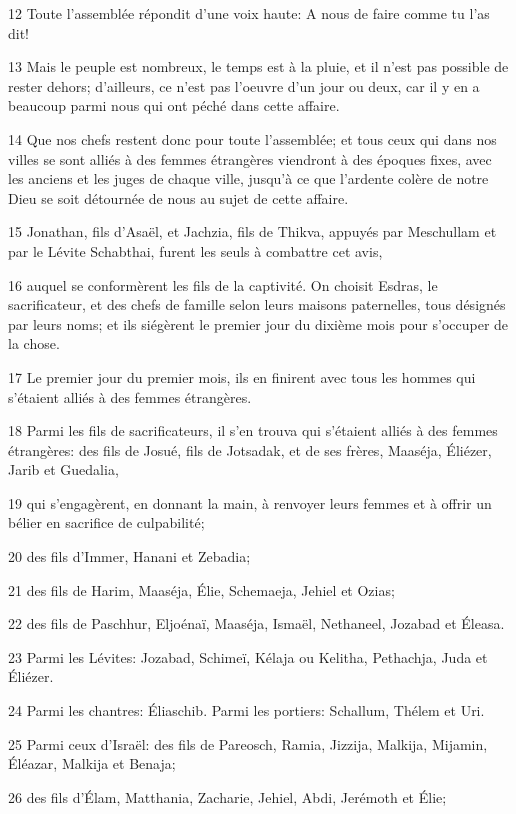 \par 12 Toute l'assemblée répondit d'une voix haute: A nous de faire comme tu l'as dit!
\par 13 Mais le peuple est nombreux, le temps est à la pluie, et il n'est pas possible de rester dehors; d'ailleurs, ce n'est pas l'oeuvre d'un jour ou deux, car il y en a beaucoup parmi nous qui ont péché dans cette affaire.
\par 14 Que nos chefs restent donc pour toute l'assemblée; et tous ceux qui dans nos villes se sont alliés à des femmes étrangères viendront à des époques fixes, avec les anciens et les juges de chaque ville, jusqu'à ce que l'ardente colère de notre Dieu se soit détournée de nous au sujet de cette affaire.
\par 15 Jonathan, fils d'Asaël, et Jachzia, fils de Thikva, appuyés par Meschullam et par le Lévite Schabthai, furent les seuls à combattre cet avis,
\par 16 auquel se conformèrent les fils de la captivité. On choisit Esdras, le sacrificateur, et des chefs de famille selon leurs maisons paternelles, tous désignés par leurs noms; et ils siégèrent le premier jour du dixième mois pour s'occuper de la chose.
\par 17 Le premier jour du premier mois, ils en finirent avec tous les hommes qui s'étaient alliés à des femmes étrangères.
\par 18 Parmi les fils de sacrificateurs, il s'en trouva qui s'étaient alliés à des femmes étrangères: des fils de Josué, fils de Jotsadak, et de ses frères, Maaséja, Éliézer, Jarib et Guedalia,
\par 19 qui s'engagèrent, en donnant la main, à renvoyer leurs femmes et à offrir un bélier en sacrifice de culpabilité;
\par 20 des fils d'Immer, Hanani et Zebadia;
\par 21 des fils de Harim, Maaséja, Élie, Schemaeja, Jehiel et Ozias;
\par 22 des fils de Paschhur, Eljoénaï, Maaséja, Ismaël, Nethaneel, Jozabad et Éleasa.
\par 23 Parmi les Lévites: Jozabad, Schimeï, Kélaja ou Kelitha, Pethachja, Juda et Éliézer.
\par 24 Parmi les chantres: Éliaschib. Parmi les portiers: Schallum, Thélem et Uri.
\par 25 Parmi ceux d'Israël: des fils de Pareosch, Ramia, Jizzija, Malkija, Mijamin, Éléazar, Malkija et Benaja;
\par 26 des fils d'Élam, Matthania, Zacharie, Jehiel, Abdi, Jerémoth et Élie;
